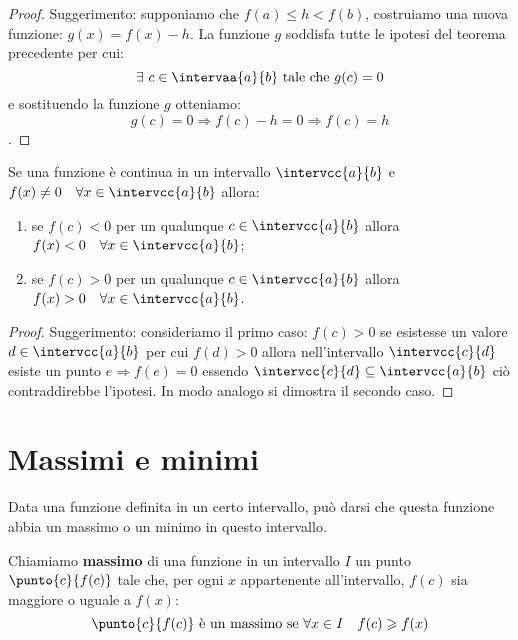\begin{proof}
Suggerimento: 
supponiamo che \(f(a) \leqslant h < f(b)\), 
costruiamo una nuova funzione: \(g(x)=f(x)-h\).
La funzione \(g\) soddisfa tutte le ipotesi del teorema precedente per cui:
\[\exists~c \in \intervaa{a}{b} \text{ tale che } g(c)=0\]
e sostituendo la funzione \(g\) otteniamo:
\[g(c)=0 \Rightarrow f(c)-h=0 \Rightarrow f(c)=h\].
\end{proof}

\begin{corollario}
Se una funzione è continua in un
intervallo \(\intervcc{a}{b}\) e 
\(f(x)\neq 0 \quad \forall x \in \intervcc{a}{b}\) 
allora:
\begin{enumerate}[nosep]
 \item se \(f(c)<0\) \quad per un qualunque \quad \(c \in \intervcc{a}{b}\)
 \quad allora \quad \(f(x)<0 \quad \forall x \in \intervcc{a}{b}\);
 \item se \(f(c)>0\) \quad per un qualunque \quad \(c \in \intervcc{a}{b}\)
 \quad allora \quad \(f(x)>0 \quad \forall x \in \intervcc{a}{b}\).
\end{enumerate}
\end{corollario}

\begin{proof}
Suggerimento: 
consideriamo il primo caso: \(f(c)>0\) 
se esistesse un valore \(d \in \intervcc{a}{b}\) per cui
\(f(d)>0\) allora nell'intervallo \(\intervcc{c}{d}\) 
esiste un punto \(e \Rightarrow f(e)=0\)
essendo \(\intervcc{c}{d} \subseteq \intervcc{a}{b}\) 
ciò contraddirebbe l'ipotesi.
In modo analogo si dimostra il secondo caso.
\end{proof}

\section{Massimi e minimi}
\label{sec:cont_massimiminimi}

Data una funzione definita in un certo intervallo, può darsi che questa 
funzione abbia un massimo o un minimo in questo intervallo.

\begin{definizione}
 Chiamiamo \textbf{massimo} di una funzione in un intervallo \(I\) un punto 
\(\punto{c}{f(c)}\) tale che, per ogni \(x\) appartenente all'intervallo, 
\(f(c)\) sia maggiore o uguale a \(f(x)\):
\[\punto{c}{f(c)} \text{ è un massimo se } \forall x \in I \quad
f(c) \geqslant f(x)\]
\end{definizione}

